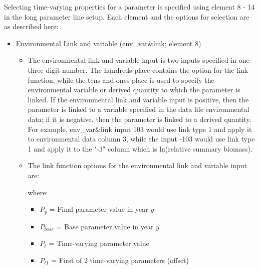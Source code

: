 Selecting time-varying properties for a parameter is specified using element 8 - 14 in the long parameter line setup.  Each element and the options for selection are as described here:

\hypertarget{EnvVar}{}
\begin{itemize}

\item Environmental Link and variable (env\_var\&link; element 8)
	\begin{itemize}
	   \item The environmental link and variable input is two inputs specified in one three digit number. The hundreds place contains the option for the link function, while the tens and ones place is used to specify the environmental variable or derived quantity to which the parameter is linked. If the environmental link and variable input is positive, then the parameter is linked to a variable specified in the data file environmental data; if it is negative, then the parameter is linked to a derived quantity. For example, env\_var\&link input 103 would use link type 1 and apply it to environmental data column 3, while the input -103  would use link type 1 and apply it to the "-3" column which is ln(relative summary biomass).
	   \item The link function options for  the environmental link and variable input are:
	   \begin{itemize}
	       \item 1 = exponential scalar: $P_{y} = P_{base}e^{P_{t}E_{y}}$
		   \item 2 = linear offset: $P_{y} = P_{base} + P_{t}E_{y}$
		   \item 3 = Bounded replacement: $P_{y} = min(P_{base}) + \frac{max(P_{base})-min(P_{base})}{1+e^{Pt*Ey+ln((P_{base}-min(P_{base})+0.0000001)/(max(P_{basey)-P_{base}+0.0000001))}}$
		   \item 4 = Logistic: $P_{y} = P_{base}\frac{2}{1+e^{-P_{t2}(E_{y}-P_{t1})}}$
	    \end{itemize}
		where:
	   \begin{itemize}
	       \item $P_{y}$ = Final parameter value in year $y$
           \item $P_{base}$ = Base parameter value in year $y$
           \item $P_{t}$ = Time-varying parameter value
           \item $P_{t1}$ = First of 2 time-varying parameters (offset)

\end{itemize}
\end{itemize}
\end{itemize}
